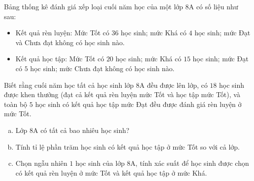 \begin{bt}%
Bảng thống kê đánh giá xếp loại cuối năm học của một lớp 8A có số liệu như sau:
\begin{itemize}
	\item Kết quả rèn luyện: Mức Tốt có $36$ học sinh; mức Khá có $4$ học sinh; mức Đạt và Chưa đạt không có học sinh nào.
	\item Kết quả học tập: Mức Tốt có $20$ học sinh; mức Khá có $15$ học sinh; mức Đạt có $5$ học sinh; mức Chưa đạt không có học sinh nào.
\end{itemize}
Biết rằng cuối năm học tất cả học sinh lớp 8A đều được lên lớp, có $18$ học sinh được khen thưởng (đạt cả kết quả rèn luyện mức Tốt và học tập mức Tốt), và toàn bộ $5$ học sinh có kết quả học tập mức Đạt đều được đánh giá rèn luyện ở mức Tốt.
\begin{enumerate}[a)]
	\item Lớp 8A có tất cả bao nhiêu học sinh?
	\item Tính tỉ lệ phần trăm học sinh có kết quả học tập ở mức Tốt so với cả lớp.
	\item Chọn ngẫu nhiên $1$ học sinh của lớp 8A, tính xác suất để học sinh được chọn có kết quả rèn luyện ở mức Tốt và kết quả học tập ở mức Khá.
\end{enumerate}
\end{bt}

